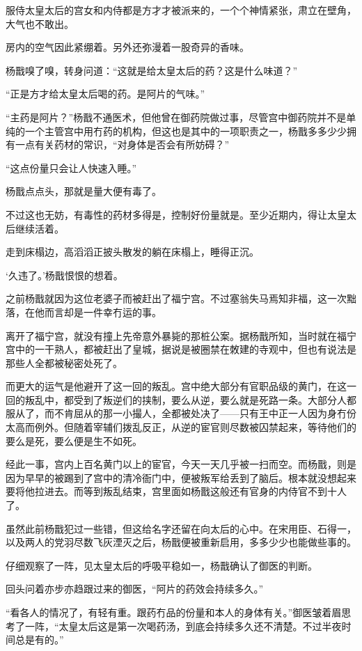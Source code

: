 服侍太皇太后的宫女和内侍都是方才才被派来的，一个个神情紧张，肃立在壁角，大气也不敢出。

房内的空气因此紧绷着。另外还弥漫着一股奇异的香味。

杨戬嗅了嗅，转身问道：“这就是给太皇太后的药？这是什么味道？”

“正是方才给太皇太后喝的药。是阿片的气味。”

“主药是阿片？”杨戬不通医术，但他曾在御药院做过事，尽管宫中御药院并不是单纯的一个主管宫中用冇药的机构，但这也是其中的一项职责之一，杨戬多多少少拥有一点有关药材的常识，“对身体是否会有所妨碍？”

“这点份量只会让人快速入睡。”

杨戬点点头，那就是量大便有毒了。

不过这也无妨，有毒性的药材多得是，控制好份量就是。至少近期内，得让太皇太后继续活着。

走到床榻边，高滔滔正披头散发的躺在床榻上，睡得正沉。

‘久违了。’杨戬恨恨的想着。

之前杨戬就因为这位老婆子而被赶出了福宁宫。不过塞翁失马焉知非福，这一次黜落，在他而言却是一件幸冇运的事。

离开了福宁宫，就没有撞上先帝意外暴毙的那桩公案。据杨戬所知，当时就在福宁宫中的一干熟人，都被赶出了皇城，据说是被圈禁在敇建的寺观中，但也有说法是那些人全都被秘密处死了。

而更大的运气是他避开了这一回的叛乱。宫中绝大部分有官职品级的黄门，在这一回的叛乱中，都受到了叛逆们的挟制，要么从逆，要么就是死路一条。大部分人都服从了，而不肯屈从的那一小撮人，全都被处决了——只有王中正一人因为身冇份太高而例外。但随着宰辅们拨乱反正，从逆的宦官则尽数被囚禁起来，等待他们的要么是死，要么便是生不如死。

经此一事，宫内上百名黄门以上的宦官，今天一天几乎被一扫而空。而杨戬，则是因为早早的被踢到了宫中的清冷衙门中，便被叛军给丢到了脑后。根本就没想起来要将他拉进去。而等到叛乱结束，宫里面如杨戬这般还有官身的内侍官不到十人了。

虽然此前杨戬犯过一些错，但这给名字还留在向太后的心中。在宋用臣、石得一，以及两人的党羽尽数飞灰湮灭之后，杨戬便被重新启用，多多少少也能做些事的。

仔细观察了一阵，见太皇太后的呼吸平稳如一，杨戬确认了御医的判断。

回头问着亦步亦趋跟过来的御医，“阿片的药效会持续多久。”

“看各人的情况了，有轻有重。跟药冇品的份量和本人的身体有关。”御医皱着眉思考了一阵，“太皇太后这是第一次喝药汤，到底会持续多久还不清楚。不过半夜时间总是有的。”

